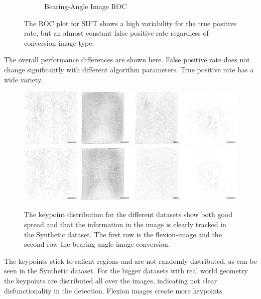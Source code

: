 \begin{figure}[H]
\begin{subfigure}[t]{0.45\linewidth}
    \caption{Bearing-Angle Image ROC}
\end{subfigure}
    \caption{The ROC plot for SIFT shows a high variability for the true positive rate, but an almost constant false positive rate regardless of conversion image type.}
\end{figure}
The overall performance differences are shown here.
False positive rate does not change significantly with different algorithm parameters.
True positive rate has a wide variety.
\begin{figure}[H]
    \includegraphics[width=\linewidth]{chapter06/results/SIFT/flexion/distribution.pdf}\\
    \includegraphics[width=\linewidth]{chapter06/results/SIFT/bearing/distribution.pdf}%
    \caption{The keypoint distribution for the different datasets show both good spread and that the information in the image is clearly tracked in the Synthetic dataset. The first row is the \gls{flexion-image} and the second row the \gls{bearing-angle-image} conversion.}
\end{figure}
The keypoints stick to salient regions and are not randomly distributed, as can be seen in the Synthetic dataset.
For the bigger datasets with real world geometry the keypoints are distributed all over the images, indicating not clear disfunctionality in the detection.
Flexion images create more keypoints.
